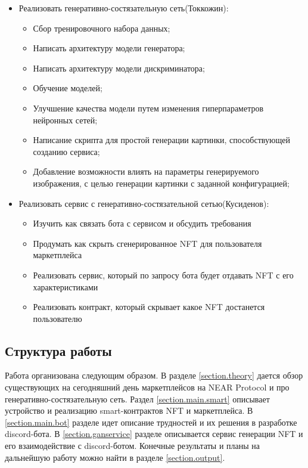 \begin{itemize}
\begin{itemize}
    \end{itemize}
    \item Реализовать генеративно-состязательную сеть(Токкожин):
    \begin{itemize}
        \item Сбор тренировочного набора данных;
        \item Написать архитектуру модели генератора;
        \item Написать архитектуру модели дискриминатора;
        \item Обучение моделей;
        \item Улучшение качества модели путем изменения гиперпараметров нейронных сетей;
        \item Написание скрипта для простой генерации картинки, способствующей созданию сервиса;
        \item Добавление возможности влиять на параметры генерируемого изображения, с целью генерации картинки с заданной конфигурацией;
    \end{itemize}
        \item Реализовать сервис с генеративно-состязательной сетью(Кусиденов):
    \begin{itemize}
    	\item Изучить как связать бота с сервисом и обсудить требования
    	\item Продумать как скрыть сгенерированное NFT для пользователя маркетплейса
    	\item Реализовать сервис, который по запросу бота будет отдавать NFT с его характеристиками
    	\item Реализовать контракт, который скрывает какое NFT достанется пользователю
    \end{itemize}
\end{itemize}

\subsection{Структура работы}

Работа организована следующим образом. В разделе {\color{blue} \ref{section.theory}} дается обзор существующих на сегодняшний день маркетплейсов на NEAR Protocol и про генеративно-состязательную сеть. Раздел {\color{blue} \ref{section.main.smart}} описывает устройство и реализацию smart-контрактов NFT и маркетплейса. В {\color{blue} \ref{section.main.bot}} разделе идет описание трудностей и их решения в разработке discord-бота. В {\color{blue} \ref{section.ganservice}} разделе описывается сервис генерации NFT и его взаимодействие с discord-ботом.
Конечные результаты и планы на дальнейшую работу можно найти в разделе {\color{blue} \ref{section.output}}.
